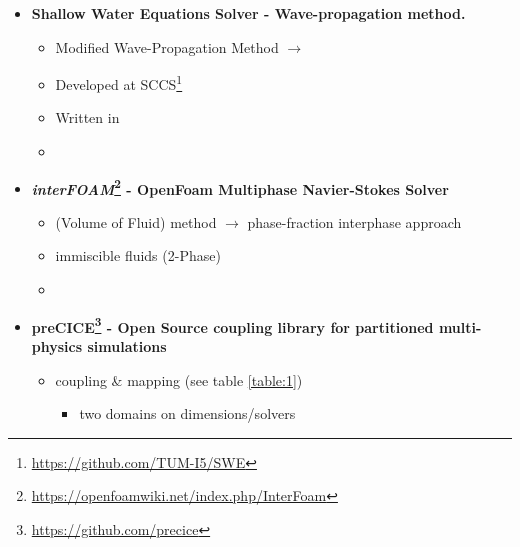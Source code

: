 
\begin{frame}
 	
\begin{multicols}{2}
\begin{itemize}
 \setlength\itemsep{10pt}

\item<2->[]
\textbf{Shallow Water Equations Solver - {\small Wave-propagation method.}}
\begin{itemize}
\vspace{5pt}
 \setlength\itemsep{6pt}
\item Modified Wave-Propagation Method $\rightarrow$  \cite{levequeArticle}
\item Developed at SCCS\footnote{\url{https://github.com/TUM-I5/SWE}}
\item Written in 
\item {}
\end{itemize}

\item<3->[]
\textbf{\textit{interFOAM}\footnote{\url{https://openfoamwiki.net/index.php/InterFoam}} - {\small OpenFoam Multiphase Navier-Stokes Solver}}
\begin{itemize}
\vspace{5pt}
 \setlength\itemsep{6pt}
\item {} (Volume of Fluid) method $\rightarrow$ phase-fraction interphase approach  
\item immiscible fluids (2-Phase)
\item {}
\end{itemize}

\vfill\columnbreak
\item<4->[]
\textbf{preCICE\footnote{\url{https://github.com/precice}} - \small{Open Source coupling library for partitioned multi-physics simulations}}
\begin{itemize}
\vspace{5pt}
\item coupling \& mapping {\tiny (see table \ref{table:1})}
\begin{itemize}
\item[] two domains on  dimensions/solvers
\end{itemize}
\end{itemize}
\end{itemize}

\end{multicols}

\end{frame}

